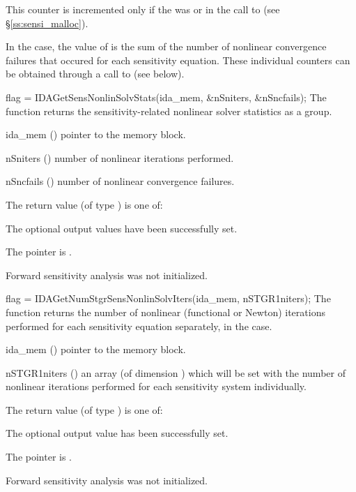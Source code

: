 {
  This counter is incremented only if the  was  or 
   in the call to  (see \S\ref{ss:sensi_malloc}).
  
  In the  case, the value of  is the sum of 
  the number of nonlinear convergence failures that occured for each sensitivity equation.
  These individual counters can be obtained through a call to
   (see below).
}
{
  flag = IDAGetSensNonlinSolvStats(ida\_mem, \&nSniters, \&nSncfails);
}
{
  The function  returns the sensitivity-related
  nonlinear solver statistics as a group.
}
{
  \begin{args}
  \item[ida\_mem] ()
    pointer to the {\idas} memory block.
  \item[nSniters] ()
    number of nonlinear iterations performed.
  \item[nSncfails] ()
    number of nonlinear convergence failures.
  \end{args}
}
{
  The return value  (of type ) is one of:
  \begin{args}
  \item[\Id{IDA\_SUCCESS}] 
    The optional output values have been successfully set.
  \item[\Id{IDA\_MEM\_NULL}]
    The  pointer is .
  \item[\Id{IDA\_NO\_SENS}]
    Forward sensitivity analysis was not initialized.
  \end{args}
}
{}
{
  flag = IDAGetNumStgrSensNonlinSolvIters(ida\_mem, nSTGR1niters);
}
{
  The function  returns the
  number of nonlinear (functional or Newton) iterations performed for 
  each sensitivity equation separately, in the  case.
}
{
  \begin{args}
  \item[ida\_mem] ()
    pointer to the {\idas} memory block.
  \item[nSTGR1niters] ()
    an array (of dimension ) which will be set with the number of 
    nonlinear iterations performed for each sensitivity system individually.
  \end{args}
}
{
  The return value  (of type ) is one of:
  \begin{args}
  \item[\Id{IDA\_SUCCESS}] 
    The optional output value has been successfully set.
  \item[\Id{IDA\_MEM\_NULL}]
    The  pointer is .
  \item[\Id{IDA\_NO\_SENS}]
    Forward sensitivity analysis was not initialized.
  \end{args}
}
